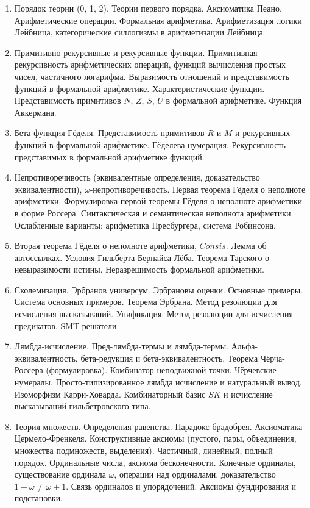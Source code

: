 \documentclass[11pt,a4paper,oneside]{scrartcl}
\begin{document}
\begin{enumerate}
\item Порядок теории (0, 1, 2). Теории первого порядка. Аксиоматика Пеано. Арифметические операции. 
Формальная арифметика. Арифметизация логики Лейбница, категорические силлогизмы в арифметизации Лейбница.
\item Примитивно-рекурсивные и рекурсивные функции. Примитивная рекурсивность арифметических операций, 
функций вычисления простых чисел, частичного логарифма.
Выразимость отношений и представимость функций в формальной арифметике. Характеристические функции.
Представимость примитивов $N$, $Z$, $S$, $U$ в формальной арифметике.
Функция Аккермана.
\item Бета-функция Гёделя. Представимость примитивов $R$ и $M$ и рекурсивных функций в формальной арифметике.
Гёделева нумерация. Рекурсивность представимых в формальной арифметике функций.
\item Непротиворечивость (эквивалентные определения, доказательство эквивалентности), $\omega$-не\-про\-ти\-во\-ре\-чи\-вость. 
Первая теорема Гёделя о неполноте арифметики.
Формулировка первой теоремы Гёделя о неполноте арифметики в форме Россера. 
Синтаксическая и семантическая неполнота арифметики.
Ослабленные варианты: арифметика Пресбургера, система Робинсона.
\item Вторая теорема Гёделя о неполноте арифметики, $Consis$. 
Лемма об автоссылках. Условия Гильберта-Бернайса-Лёба. Теорема Тарского о невыразимости истины. Неразрешимость формальной
арифметики.
\item Сколемизация. Эрбранов универсум. Эрбрановы оценки. Основные примеры. Система основных примеров. Теорема Эрбрана.
Метод резолюции для исчисления высказываний. Унификация. Метод резолюции для исчисления предикатов. SMT-решатели.
\item Лямбда-исчисление. Пред-лямбда-термы и лямбда-термы. Альфа-эквивалентность, бета-редукция
и бета-эквивалентность. Теорема Чёрча-Россера (формулировка). Комбинатор неподвижной точки. 
Чёрчевские нумералы. 
Просто-типизированное лямбда исчисление и натуральный вывод. Изоморфизм Карри-Ховарда.
Комбинаторный базис $SK$ и исчисление высказываний гильбетровского типа.
\item Теория множеств. Определения равенства. Парадокс брадобрея. Аксиоматика Цермело-Френкеля. Конструктивные аксиомы
(пустого, пары, объединения, множества подмножеств, выделения).
Частичный, линейный, полный порядок. Ординальные числа, аксиома бесконечности. 
Конечные ординалы, существование ординала $\omega$, операции над ординалами, 
доказательство $1+\omega\ne\omega+1$. Связь ординалов и упорядочений. Аксиомы фундирования и подстановки.

\end{enumerate}
\end{document}
